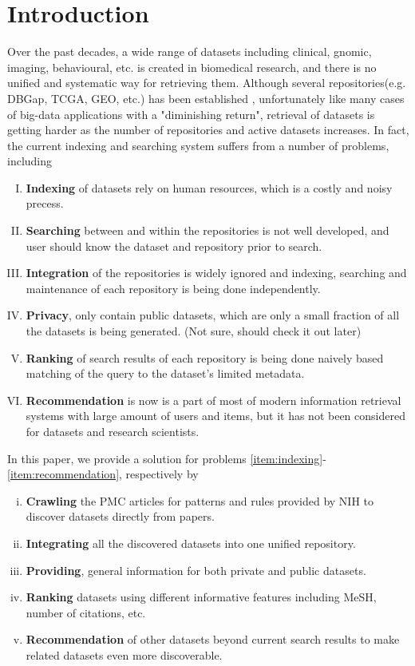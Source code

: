 \documentclass[twoside,11pt]{article}
\begin{document}
\section{Introduction} \label{sec:introduction}
Over the past decades, a wide range of datasets including clinical, gnomic, imaging, behavioural, etc. is created in biomedical research, and there is no unified and systematic way for retrieving them. Although several repositories(e.g. DBGap, TCGA, GEO, etc.) has been established \cite{nih-repo}, unfortunately like many cases of big-data applications with a "diminishing return", retrieval of datasets is getting harder as the number of repositories and active datasets increases. In fact, the current indexing and searching system suffers from a number of problems, including
\begin{enumerate}[(I)]
	\item {\bf Indexing} of datasets rely on human resources, which is a costly and noisy precess. \label{item:indexing}
	\item {\bf Searching} between and within the repositories is not well developed, and user should know the dataset and repository prior to search.
	\item {\bf Integration} of the repositories is widely ignored and indexing, searching and maintenance of each repository is being done independently.
	\item {\bf Privacy}, only contain public datasets, which are only a small fraction of all the datasets is being generated. (Not sure, should check it out later)
	\item {\bf Ranking} of search results of each repository is being done naively based matching of the query to the dataset's limited metadata.
	\item {\bf Recommendation} is now is a part of most of modern information retrieval systems with large amount of users and items, but it has not been considered for datasets and research scientists. \label{item:recommendation}
\end{enumerate}

In this paper, we provide a solution for problems \eqref{item:indexing}-\eqref{item:recommendation}, respectively by
\begin{enumerate}[(i)]
	\item {\bf Crawling} the PMC articles for patterns and rules provided by NIH to discover datasets directly from papers. \label{item:crawiling}
	\item {\bf Integrating} all the discovered datasets into one unified repository. \label{item:integrating}
	\item {\bf Providing}, general information for both private and public datasets.
	\item {\bf Ranking} datasets using different informative features including MeSH, number of citations, etc.
	\item {\bf Recommendation} of other datasets beyond current search results to make related datasets even more discoverable. \label{item:recommendation-sol}
\end{enumerate}
\end{document}
